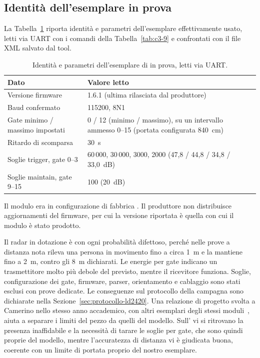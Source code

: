 \subsection{Identità dell'esemplare in prova}
\label{sec:c3-2-6}

La Tabella~\ref{tab:c3-11} riporta identità e parametri dell'esemplare effettivamente usato, letti via UART con i comandi della Tabella~\ref{tab:c3-9} e confrontati con il file XML salvato dal tool.

\begin{table}[!htb]
\centering
\caption{Identità e parametri dell'esemplare di \ldc{} in prova, letti via UART.}
\label{tab:c3-11}
\small
\begin{tabularx}{\linewidth}{@{}lX@{}}
\toprule
\textbf{Dato} & \textbf{Valore letto} \\
\midrule
Versione firmware & 1.6.1 (ultima rilasciata dal produttore) \\
Baud confermato & 115200, 8N1 \\
Gate minimo / massimo impostati & 0 / 12 (minimo / massimo), su un intervallo ammesso 0–15 (portata configurata 840~cm) \\
Ritardo di scomparsa & 30~s \\
Soglie trigger, gate 0–3 & 60\,000, 30\,000, 3000, 2000 (47,8 / 44,8 / 34,8 / 33,0~dB) \\
Soglie maintain, gate 9–15 & 100 (20~dB) \\
\bottomrule
\end{tabularx}
\end{table}

Il modulo era in configurazione di fabbrica \cite{hilinkProtoLD2420}. Il produttore non distribuisce aggiornamenti del firmware, per cui la versione riportata è quella con cui il modulo è stato prodotto.

Il radar in dotazione è con ogni probabilità difettoso, perché nelle prove a distanza nota rileva una persona in movimento fino a circa 1~m e la mantiene fino a 2~m, contro gli 8~m dichiarati. Le energie per gate indicano un trasmettitore molto più debole del previsto, mentre il ricevitore funziona. Soglie, configurazione dei gate, firmware, parser, orientamento e cablaggio sono stati esclusi con prove dedicate. Le conseguenze sul protocollo della campagna sono dichiarate nella Sezione~\ref{sec:protocollo-ld2420}. Una relazione di progetto svolta a Camerino nello stesso anno accademico, con altri esemplari degli stessi moduli~\cite{dellaquila2026}, aiuta a separare i limiti del pezzo da quelli del modello. Sull'\ldc{} vi si ritrovano la presenza inaffidabile e la necessità di tarare le soglie per gate, che sono quindi proprie del modello, mentre l'accuratezza di distanza vi è giudicata buona, coerente con un limite di portata proprio del nostro esemplare.

